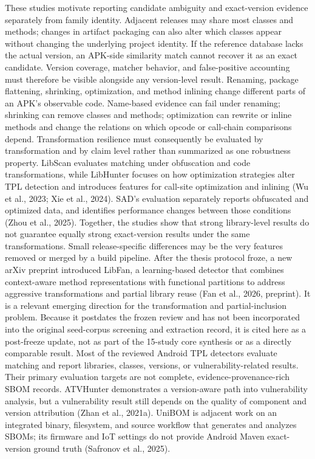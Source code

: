 \documentclass[10pt,twocolumn]{article}
\begin{document}
These studies motivate reporting candidate ambiguity and exact-version evidence separately from family identity. Adjacent releases may share most classes and methods; changes in artifact packaging can also alter which classes appear without changing the underlying project identity. If the reference database lacks the actual version, an APK-side similarity match cannot recover it as an exact candidate. Version coverage, matcher behavior, and false-positive accounting must therefore be visible alongside any version-level result.
Renaming, package flattening, shrinking, optimization, and method inlining change different parts of an APK's observable code. Name-based evidence can fail under renaming; shrinking can remove classes and methods; optimization can rewrite or inline methods and change the relations on which opcode or call-chain comparisons depend. Transformation resilience must consequently be evaluated by transformation and by claim level rather than summarized as one robustness property.
LibScan evaluates matching under obfuscation and code transformations, while LibHunter focuses on how optimization strategies alter TPL detection and introduces features for call-site optimization and inlining (Wu et al., 2023; Xie et al., 2024). SAD's evaluation separately reports obfuscated and optimized data, and identifies performance changes between those conditions (Zhou et al., 2025). Together, the studies show that strong library-level results do not guarantee equally strong exact-version results under the same transformations. Small release-specific differences may be the very features removed or merged by a build pipeline.
After the thesis protocol froze, a new arXiv preprint introduced LibFan, a learning-based detector that combines context-aware method representations with functional partitions to address aggressive transformations and partial library reuse (Fan et al., 2026, preprint). It is a relevant emerging direction for the transformation and partial-inclusion problem. Because it postdates the frozen review and has not been incorporated into the original seed-corpus screening and extraction record, it is cited here as a post-freeze update, not as part of the 15-study core synthesis or as a directly comparable result.
Most of the reviewed Android TPL detectors evaluate matching and report libraries, classes, versions, or vulnerability-related results. Their primary evaluation targets are not complete, evidence-provenance-rich SBOM records. ATVHunter demonstrates a version-aware path into vulnerability analysis, but a vulnerability result still depends on the quality of component and version attribution (Zhan et al., 2021a). UniBOM is adjacent work on an integrated binary, filesystem, and source workflow that generates and analyzes SBOMs; its firmware and IoT settings do not provide Android Maven exact-version ground truth (Safronov et al., 2025).
\end{document}
